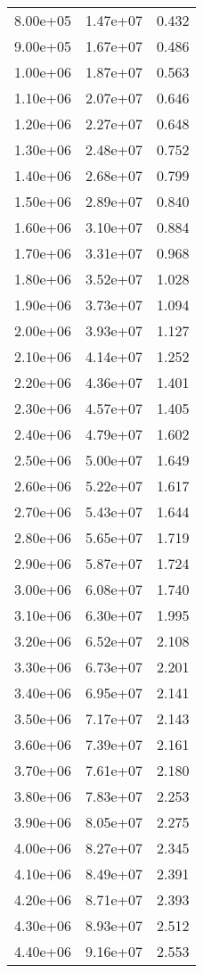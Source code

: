\begin{table}
\begin{tabular}{lll}
8.00e+05 & 1.47e+07 & 0.432 \\
9.00e+05 & 1.67e+07 & 0.486 \\
1.00e+06 & 1.87e+07 & 0.563 \\
1.10e+06 & 2.07e+07 & 0.646 \\
1.20e+06 & 2.27e+07 & 0.648 \\
1.30e+06 & 2.48e+07 & 0.752 \\
1.40e+06 & 2.68e+07 & 0.799 \\
1.50e+06 & 2.89e+07 & 0.840 \\
1.60e+06 & 3.10e+07 & 0.884 \\
1.70e+06 & 3.31e+07 & 0.968 \\
1.80e+06 & 3.52e+07 & 1.028 \\
1.90e+06 & 3.73e+07 & 1.094 \\
2.00e+06 & 3.93e+07 & 1.127 \\
2.10e+06 & 4.14e+07 & 1.252 \\
2.20e+06 & 4.36e+07 & 1.401 \\
2.30e+06 & 4.57e+07 & 1.405 \\
2.40e+06 & 4.79e+07 & 1.602 \\
2.50e+06 & 5.00e+07 & 1.649 \\
2.60e+06 & 5.22e+07 & 1.617 \\
2.70e+06 & 5.43e+07 & 1.644 \\
2.80e+06 & 5.65e+07 & 1.719 \\
2.90e+06 & 5.87e+07 & 1.724 \\
3.00e+06 & 6.08e+07 & 1.740 \\
3.10e+06 & 6.30e+07 & 1.995 \\
3.20e+06 & 6.52e+07 & 2.108 \\
3.30e+06 & 6.73e+07 & 2.201 \\
3.40e+06 & 6.95e+07 & 2.141 \\
3.50e+06 & 7.17e+07 & 2.143 \\
3.60e+06 & 7.39e+07 & 2.161 \\
3.70e+06 & 7.61e+07 & 2.180 \\
3.80e+06 & 7.83e+07 & 2.253 \\
3.90e+06 & 8.05e+07 & 2.275 \\
4.00e+06 & 8.27e+07 & 2.345 \\
4.10e+06 & 8.49e+07 & 2.391 \\
4.20e+06 & 8.71e+07 & 2.393 \\
4.30e+06 & 8.93e+07 & 2.512 \\
4.40e+06 & 9.16e+07 & 2.553 \\

\end{tabular}
\end{table}
